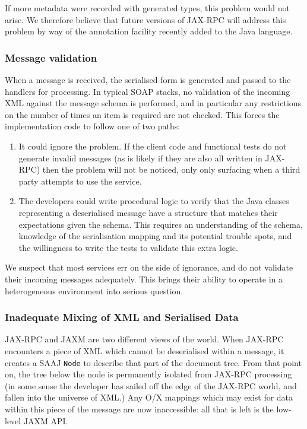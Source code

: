 If more metadata were recorded with generated types, this problem would not
arise. We therefore believe that future versions of JAX-RPC will address this 
problem by way of the annotation facility recently added to the Java
language. 

\subsubsection{Message validation}
\label{objections:o-x:validation}

When a message is received, the serialised form is generated and
passed to the handlers for processing. In typical SOAP stacks,
no validation of the incoming XML against the message schema is
performed, and in particular any restrictions on the number of times
an item is required are not checked. This forces the implementation
code to follow one of two paths:
\begin{enumerate}

\item It could ignore the problem. If the client code and functional
tests do not generate invalid messages (as is likely if they are also
all written in JAX-RPC) then the problem will not be noticed, only
only surfacing when a third party attempts to use the service.

\item The developers could write procedural logic to verify that the
Java classes representing a deserialised message have a structure that
matches their expectations given the schema. This requires an
understanding of the schema, knowledge of the serialisation mapping
and its potential trouble spots, and the willingness to write the tests to
validate this extra logic.

\end{enumerate}

We suspect that most services err on the side of ignorance, and do not
validate their incoming messages adequately. This brings their ability
to operate in a heterogeneous environment into serious question.

\subsubsection{Inadequate Mixing of XML and Serialised Data}
\label{objections:o-x:mixing}

JAX-RPC and JAXM are two different views of the world. When JAX-RPC
encounters a piece of XML which cannot be deserialised within a
message, it creates a SAAJ {\tt Node} to describe that part of the
document tree.  From that point on, the tree below the node is
permanently isolated from JAX-RPC processing (in some sense the
developer has sailed off the edge of the JAX-RPC world, and fallen
into the universe of XML.) Any O/X mappings which may exist for data
within this piece of the message are now inaccessible: all that is
left is the low-level JAXM API.

